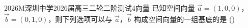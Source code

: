 
\begin{problem}{2026}{M}{深圳中学2026届高三二轮二阶测试}{4}{向量}
已知空间向量 $\vec{a}=(1,0,0)$，$\vec{b}=(0,1,0)$，则下列选项可以与 $\vec{a}$，$\vec{b}$ 构成空间向量的一组基底的是 (\hspace{1cm})
\begin{choices}
\end{choices}
\end{problem}